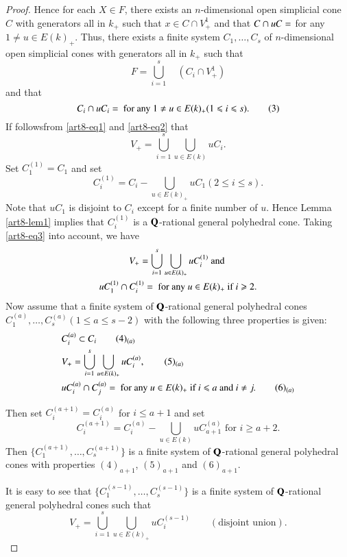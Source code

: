 \begin{proof}
Hence for each $X \in F$, there exists an $n$-dimensional open simplicial cone $C$ with generators all in $k_+$ such that $x \in C \cap V^1_+$ and that $C \cap u C = \empty$ for any $1 \neq u \in E(k)_+$. Thus, there exists a finite system $C_1, \ldots, C_s$ of $n$-dimensional open simplicial cones with generators all in $k_+$ such that 
\begin{equation*}
F = \bigcup\limits^s_{i=1} \quad  (C_i \cap V^1_+) \tag{2}\label{art8-eq2}
\end{equation*}
and that 
\begin{equation*}
C_i \cap u C_i =\empty \text{ for any } 1 \neq u \in E (k)_+ (1 \leqslant i \leqslant s).\tag{3} \label{art8-eq3}
\end{equation*}
If follows\pageoriginale from \eqref{art8-eq1} and \eqref{art8-eq2} that 
$$
V_+ = \bigcup\limits^s_{i=1} \bigcup\limits_{u \in E (k)} u C_i.
$$
Set $C^{(1)}_1 = C_1$ and set
$$
C^{(1)}_i = C_i - \bigcup\limits_{u \in E (k)_+} u C_1 (2 \leqslant i \leqslant s).
$$
Note that $u C_1$ is disjoint to $C_i$ except for a finite number of $u$. Hence Lemma \ref{art8-lem1} implies that $C^{(1)}_i$ is a $\mathbf{Q}$-rational general polyhedral cone. Taking \eqref{art8-eq3} into account, we have
\begin{gather*}
V_+ = \bigcup\limits^s_{i=1} \bigcup\limits_{u \in E(k)_+} uC^{(1)}_i \text{~ and }\\
u C^{(1)}_1 \cap C^{(1)}_i = \empty \text{~ for any ~} u \in E (k)_+ \text{ if } i \geqslant 2.
\end{gather*}
Now assume that a finite system of $\mathbf{Q}$-rational general polyhedral cones $C^{(a)}_1,\ldots, C^{(a)}_s (1 \leqslant a \leqslant s -2)$ with the following three properties is given:
\begin{align*}
& C^{(a)}_i \subset C_i \tag*{(4)$_{(a)}$}\label{art8-eq(4a)}\\
& V_+ =  \bigcup\limits^s_{i=1} \bigcup\limits_{u \in E (k)_+} u C^{(a)}_i, \tag*{(5)$_{(a)}$}\label{art8-eq(5a)}\\
& uC^{(a)}_i \cap C^{(a)}_j = \empty \text{ for any } u \in E (k)_+ \text{ if } i \leqslant a \text{ and } i \neq j. \tag*{(6)$_{(a)}$}\label{art8-eq(6a)}
\end{align*}
 
Then set $C^{(a+1)}_i = C^{(a)}_i$ for $i \leqslant a + 1$ and set
$$
C^{(a+1)}_i = C^{(a)}_i - \bigcup\limits_{u \in E (k)} u C^{(a)}_{a+1} \text{ for } i \geqslant a+2.
$$
Then $\{C^{(a+1)}_1, \ldots, C^{(a+1)}_s\}$ is a finite system of $\mathbf{Q}$-rational general polyhedral cones with properties $(4)_{a+1}$, $(5)_{a+1}$ and $(6)_{a+1}$.

It is easy to see that $\{C^{(s-1)}_1, \ldots, C^{(s-1)}_s\}$ is a finite system of $\mathbf{Q}$-rational general polyhedral cones such that 
$$
V_+ = \bigcup\limits^s_{i=1} \bigcup\limits_{u \in E(k)_+} u C^{(s-1)}_i \qquad (\text{disjoint union}).
$$
\end{proof}

